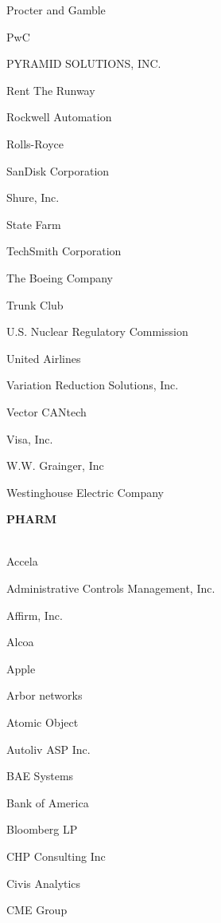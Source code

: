 \documentclass[twoside]{article}
\begin{document}
\begin{center}
\begin{multicols}{5}
\begin{FlushLeft}
\begin{compactitem}
\item Procter and Gamble
\item PwC
\item PYRAMID SOLUTIONS, INC.
\item Rent The Runway
\item Rockwell Automation
\item Rolls-Royce
\item SanDisk Corporation
\item Shure, Inc.
\item State Farm
\item TechSmith Corporation
\item The Boeing Company
\item Trunk Club
\item U.S. Nuclear Regulatory Commission
\item United Airlines
\item Variation Reduction Solutions, Inc.
\item Vector CANtech
\item Visa, Inc.
\item W.W. Grainger, Inc
\item Westinghouse Electric Company
\end{compactitem}
        \end{FlushLeft}
        \vspace{1em}
        {\fontsize{14}{16}\selectfont \bf PHARM}\\
        \vspace{-1em}
        ~\hrulefill~
        \vspace{-.9em}
        \begin{FlushLeft}
        \begin{compactitem}
        \item Accela
\item Administrative Controls Management, Inc.
\item Affirm, Inc.
\item Alcoa
\item Apple
\item Arbor networks
\item Atomic Object
\item Autoliv ASP Inc.
\item BAE Systems
\item Bank of America
\item Bloomberg LP
\item CHP Consulting Inc
\item Civis Analytics
\item CME Group

\end{compactitem}
\end{FlushLeft}
\end{multicols}
\end{center}
\end{document}
